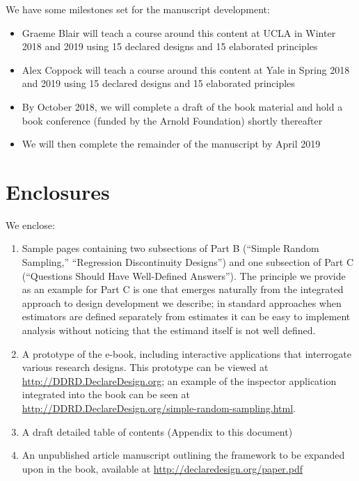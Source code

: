 \documentclass[11pt]{article}
\begin{document}
We have some milestones set for the manuscript development:

\begin{itemize}
\item 	Graeme Blair will teach a course around this content at UCLA in Winter 2018 and 2019 using 15 declared designs and 15 elaborated principles
\item 	Alex Coppock will teach a course around this content at Yale in Spring 2018 and 2019 using 15 declared designs and 15 elaborated principles
\item  By October 2018, we will complete a draft of the book material and hold a book conference (funded by the Arnold Foundation) shortly thereafter
\item We will then complete the remainder of the manuscript by April 2019
\end{itemize}

\section{Enclosures}

We enclose:

\begin{enumerate}
\item Sample pages containing two subsections of Part B (``Simple Random Sampling,'' ``Regression Discontinuity Designs'') and one subsection of Part C (``Questions Should Have Well-Defined Answers'').  The principle we provide as an example for Part C is one that emerges naturally from the integrated approach to design development we describe; in standard approaches when estimators are defined separately from estimates it can be easy to implement analysis without noticing that the estimand itself is not well defined.  
\item A prototype of the e-book, including interactive applications that interrogate various research designs. This prototype can be viewed at \url{http://DDRD.DeclareDesign.org}; an example of the inspector application integrated into the book can be seen at \url{http://DDRD.DeclareDesign.org/simple-random-sampling.html}.
\item A draft detailed table of contents (Appendix to this document)
\item An unpublished article manuscript outlining the framework to be expanded upon in the book, available at \url{http://declaredesign.org/paper.pdf}
\end{enumerate}	

\clearpage\newpage
\end{document}
